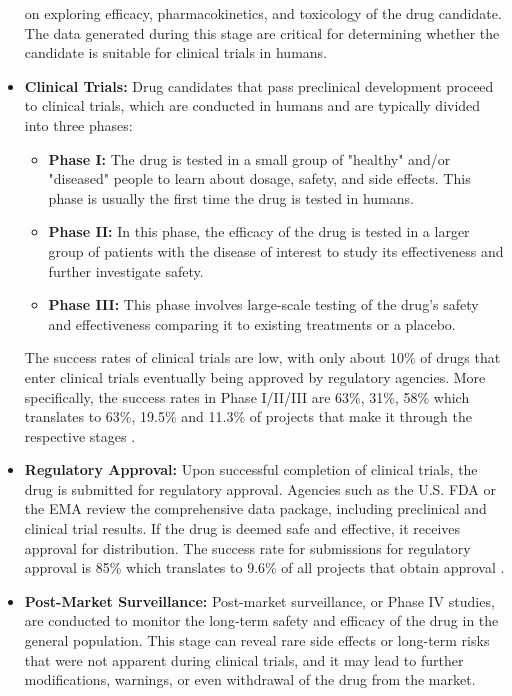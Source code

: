 \begin{itemize}
          on exploring efficacy, pharmacokinetics, and toxicology of the drug candidate. The data
          generated during this stage are critical for determining whether the candidate is
          suitable for clinical trials in humans.
    \item \textbf{Clinical Trials:} Drug candidates that pass preclinical development proceed to
          clinical trials, which are conducted in humans and are typically divided into three phases:
          \begin{itemize}
              \item \textbf{Phase I:} The drug is tested in a small group of "healthy" and/or "diseased" people to learn about
                    dosage, safety, and side effects. This phase is usually the first time the drug is tested in humans.
              \item \textbf{Phase II:} In this phase, the efficacy of the drug is tested in a larger
                    group of patients with the disease of interest to study its effectiveness and further investigate safety.
              \item \textbf{Phase III:} This phase involves large-scale testing of the drug's safety
                    and effectiveness comparing it to existing treatments or a placebo.
          \end{itemize}
          The success rates of clinical trials are low, with only about 10\% of drugs that enter clinical
          trials eventually being approved by regulatory agencies. More specifically, the success rates in
          Phase I/II/III are 63\%, 31\%, 58\% which translates to 63\%, 19.5\% and 11.3\% of projects that
          make it through the respective stages \citep{mullardParsingClinicalSuccess2016}.
    \item \textbf{Regulatory Approval:} Upon successful completion of clinical trials, the drug is
          submitted for regulatory approval. Agencies such as the U.S. \Ac{FDA} or the \Ac{EMA}
          review the comprehensive data package, including preclinical and clinical trial results.
          If the drug is deemed safe and effective, it receives approval for distribution. The
          success rate for submissions for regulatory approval is 85\% which translates to 9.6\% of
          all projects that obtain approval \citep{mullardParsingClinicalSuccess2016}.
    \item \textbf{Post-Market Surveillance:} Post-market surveillance, or Phase IV studies, are
          conducted to monitor the long-term safety and efficacy of the drug in the general population.
          This stage can reveal rare side effects or long-term risks that were not apparent during
          clinical trials, and it may lead to further modifications, warnings, or even withdrawal of the
          drug from the market.
\end{itemize}

